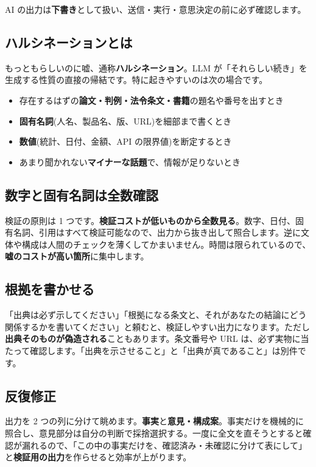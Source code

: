 \documentclass{article}
\begin{document}
AI の出力は\textbf{下書き}として扱い、送信・実行・意思決定の前に必ず確認します。

\subsection{ハルシネーションとは}

もっともらしいのに嘘、通称\textbf{ハルシネーション}。LLM が「それらしい続き」を生成する性質の直接の帰結です。特に起きやすいのは次の場合です。

\begin{itemize}
\item 存在するはずの\textbf{論文・判例・法令条文・書籍}の題名や番号を出すとき
\item \textbf{固有名詞}(人名、製品名、版、URL)を細部まで書くとき
\item \textbf{数値}(統計、日付、金額、API の限界値)を断定するとき
\item あまり聞かれない\textbf{マイナーな話題}で、情報が足りないとき
\end{itemize}

\subsection{数字と固有名詞は全数確認}

検証の原則は 1 つです。\textbf{検証コストが低いものから全数見る}。数字、日付、固有名詞、引用はすべて検証可能なので、出力から抜き出して照合します。逆に文体や構成は人間のチェックを薄くしてかまいません。時間は限られているので、\textbf{嘘のコストが高い箇所}に集中します。

\subsection{根拠を書かせる}

「出典は必ず示してください」「根拠になる条文と、それがあなたの結論にどう関係するかを書いてください」と頼むと、検証しやすい出力になります。ただし\textbf{出典そのものが偽造される}こともあります。条文番号や URL は、必ず実物に当たって確認します。「出典を示させること」と「出典が真であること」は別件です。

\subsection{反復修正}

出力を 2 つの列に分けて眺めます。\textbf{事実}と\textbf{意見・構成案}。事実だけを機械的に照合し、意見部分は自分の判断で採捨選択する。一度に全文を直そうとすると確認が漏れるので、「この中の事実だけを、確認済み・未確認に分けて表にして」と\textbf{検証用の出力}を作らせると効率が上がります。
\end{document}
